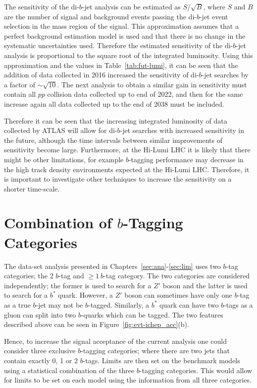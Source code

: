 The sensitivity of the di-$b$-jet analysis can be estimated as $S/\sqrt{B}$,
where $S$ and $B$ are the number of signal and background events passing the di-$b$-jet event selection in the mass region of the signal.
This approximation assumes that a perfect background estimation model is used and that there is no change in the systematic uncertainties used.
Therefore the estimated sensitivity of the di-$b$-jet analysis is proportional to the square root of the integrated luminosity.
Using this approximation and the values in Table~\ref{tab:fut-lumi}, it can be seen that the addition of data collected in 2016
increased the sensitivity of di-$b$-jet searches by a factor of $\sim\sqrt{10}$.
The next analysis to obtain a similar gain in sensitivity must contain all $pp$ collision data collected up to end of 2022,
and then for the same increase again all data collected up to the end of 2038 must be included.

Therefore it can be seen that the increasing integrated luminosity of data collected by ATLAS will
allow for di-$b$-jet searches with increased sensitivity in the future,
although the time intervals between similar improvements of sensitivity become large.
Furthermore, at the Hi-Lumi LHC it is likely that there might be other limitations,
for example $b$-tagging performance may decrease in the high track density environments expected at the Hi-Lumi LHC.
Therefore, it is important to investigate other techniques to increase the sensitivity on a shorter time-scale.

\section{Combination of $b$-Tagging Categories}

The \summer{} data-set analysis presented in Chapters~\ref{sec:ana}-\ref{sec:lim} uses
two $b$-tag categories; the 2 $b$-tag and $\geq1~b$-tag category.
The two categories are considered independently;
the former is used to search for a $Z'$ boson and the latter is used to search for a $b^{*}$ quark.
However, a $Z'$ boson can sometimes have only one $b$-tag as a true $b$-jet may not be $b$-tagged.
Similarly, a $b^*$ quark can have two $b$-tags as a gluon can split into two $b$-quarks which can be tagged.
The two features described above can be seen in Figure~\ref{fig:evt-ichep_acc}(b).

Hence, to increase the signal acceptance of the current analysis one could consider three exclusive $b$-tagging categories;
where there are two jets that contain exactly 0, 1 or 2 $b$-tags.
Limits are then set on the benchmark models using a statistical combination of the three $b$-tagging categories.
This would allow for limits to be set on each model using the information from all three categories.

